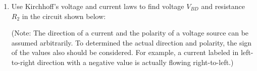\begin{enumerate}

\item Use Kirchhoff's voltage and current laws to find voltage $V_{BD}$ and 
  resistance $R_2$ in the circuit shown below:


(Note: The direction of a current and the polarity of a voltage source can
be assumed arbitrarily. To determined the actual direction and polarity, the
sign of the values also should be considered. For example, a current labeled 
in left-to-right direction with a negative value is actually flowing 
right-to-left.)


%








\end{enumerate}
